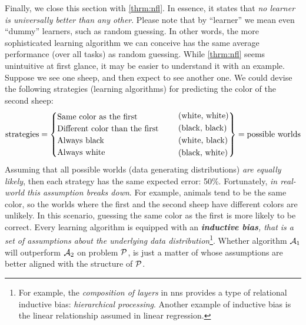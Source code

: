 Finally, we close this section with \Theorem{} \ref{thrm:nfl}. In essence, it
states that \emph{no learner is universally better than any
other}. Please note that by ``learner'' we mean even ``dummy'' learners, such as
random guessing. In other words, the more sophisticated
learning algorithm we can conceive has the same average performance (over all
tasks) as random guessing. While \Theorem{} \ref{thrm:nfl} seems unintuitive at
first glance, it may be easier to understand it with an example. Suppose we see
one sheep, and then expect to see another one.  We could devise the following
strategies (learning algorithms) for predicting the color of the second sheep:
\begin{equation}
	\label{eq:nfl}
	\text{strategies} = 
	\begin{cases}
		\text{Same color as the first} \\
		\text{Different color than the first} \\
		\text{Always black} \\
		\text{Always white} \\
	\end{cases}
	\quad
	\begin{rcases}
		\text{(white, white)} \\
		\text{(black, black)} \\
		\text{(white, black)} \\
		\text{(black, white)} \\
	\end{rcases}
	= \text{possible worlds}
\end{equation}
Assuming that all possible worlds (data generating distributions) \emph{are
equally likely}, then each strategy has the same expected error: 50\%.
Fortunately, \emph{in real-world this assumption breaks down}. For example,
animals tend to be the same color, so the worlds where the first and the second
sheep have different colors are unlikely. In this scenario, guessing the same
color as the first is more likely to be correct. Every learning algorithm is
equipped with an \emph{\textbf{inductive bias}, that is a set of assumptions about the
underlying data distribution}\footnote{For example, the \emph{composition of
layers} in \glspl{nn} provides a type of relational inductive bias:
\emph{hierarchical processing}. Another example of inductive bias is the linear
relationship assumed in linear regression.}. Whether
algorithm $\mathcal{A}_1$ will outperform $\mathcal{A}_2$ on problem $\mathcal{P}$, is just
a matter of whose assumptions are better aligned with the structure of $\mathcal{P}$.

